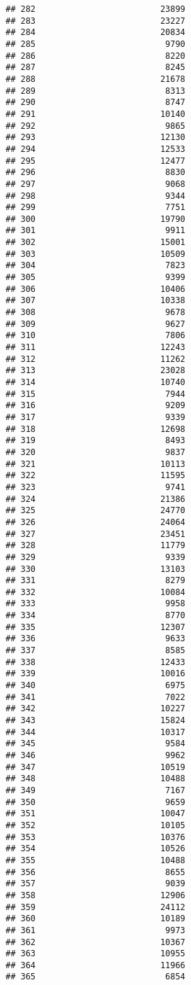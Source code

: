 \documentclass[
]{article}
\begin{document}
\begin{verbatim}
## 282                         23899
## 283                         23227
## 284                         20834
## 285                          9790
## 286                          8220
## 287                          8245
## 288                         21678
## 289                          8313
## 290                          8747
## 291                         10140
## 292                          9865
## 293                         12130
## 294                         12533
## 295                         12477
## 296                          8830
## 297                          9068
## 298                          9344
## 299                          7751
## 300                         19790
## 301                          9911
## 302                         15001
## 303                         10509
## 304                          7823
## 305                          9399
## 306                         10406
## 307                         10338
## 308                          9678
## 309                          9627
## 310                          7806
## 311                         12243
## 312                         11262
## 313                         23028
## 314                         10740
## 315                          7944
## 316                          9209
## 317                          9339
## 318                         12698
## 319                          8493
## 320                          9837
## 321                         10113
## 322                         11595
## 323                          9741
## 324                         21386
## 325                         24770
## 326                         24064
## 327                         23451
## 328                         11779
## 329                          9339
## 330                         13103
## 331                          8279
## 332                         10084
## 333                          9958
## 334                          8770
## 335                         12307
## 336                          9633
## 337                          8585
## 338                         12433
## 339                         10016
## 340                          6975
## 341                          7022
## 342                         10227
## 343                         15824
## 344                         10317
## 345                          9584
## 346                          9962
## 347                         10519
## 348                         10488
## 349                          7167
## 350                          9659
## 351                         10047
## 352                         10105
## 353                         10376
## 354                         10526
## 355                         10488
## 356                          8655
## 357                          9039
## 358                         12906
## 359                         24112
## 360                         10189
## 361                          9973
## 362                         10367
## 363                         10955
## 364                         11966
## 365                          6854
\end{verbatim}
\end{document}
